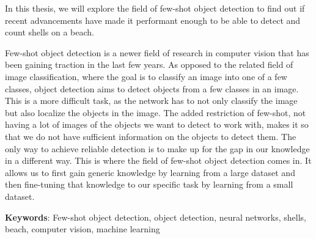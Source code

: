In this thesis, we will explore the field of few-shot object detection to find out if recent advancements have made it performant enough to be able to detect and count shells on a beach.

Few-shot object detection is a newer field of research in computer vision that has been gaining traction in the last few years. 
As opposed to the related field of image classification, where the goal is to classify an image into one of a few classes, object detection aims to detect objects from a few classes in an image. This is a more difficult task, as the network has to not only classify the image but also localize the objects in the image. The added restriction of few-shot, not having a lot of images of the objects we want to detect to work with, makes it so that we do not have sufficient information on the objects to detect them. The only way to achieve reliable detection is to make up for the gap in our knowledge in a different way. This is where the field of few-shot object detection comes in. It allows us to first gain generic knowledge by learning from a large dataset and then fine-tuning that knowledge to our specific task by learning from a small dataset.

\textbf{Keywords}: Few-shot object detection, object detection, neural networks, shells, beach, computer vision, machine learning